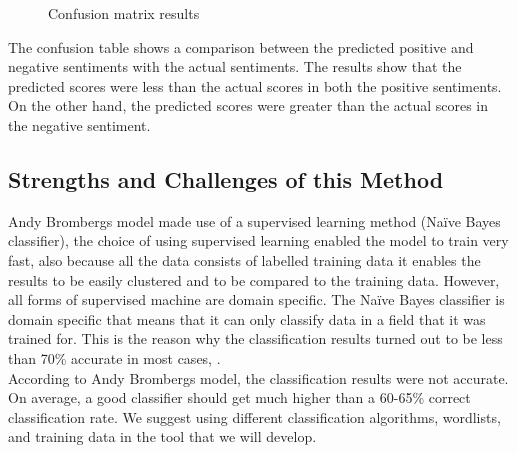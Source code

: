 \begin{figure}[h]
  \centering
  \caption[Vector graphics example]%
  {Confusion matrix results}
  \label{fig:ALAP:sm3}
\end{figure}


The confusion table shows a comparison between the predicted positive and negative sentiments
with the actual sentiments. The results show that the predicted scores were less than the actual
scores in both the positive sentiments. On the other hand, the predicted scores were greater than
the actual scores in the negative sentiment.

\subsection{Strengths and Challenges of this Method}
Andy Bromberg\textquotesingle s model made use of a supervised learning method (Naïve Bayes classifier), the
choice of using supervised learning enabled the model to train very fast, also because all the data
consists of labelled training data it enables the results to be easily clustered and to be compared to
the training data. However, all forms of supervised machine are domain specific. The Naïve Bayes
classifier is domain specific that means that it can only classify data in a field that it was trained
for. This is the reason why the classification results turned out to be less than 70\% accurate in most
cases, \cite{ref31}.
\leavevmode\\
According to Andy Bromberg\textquotesingle s model, the classification results were not accurate. On average, a
good classifier should get much higher than a 60-65\% correct classification rate. We suggest using
different classification algorithms, wordlists, and training data in the tool that we will develop.



